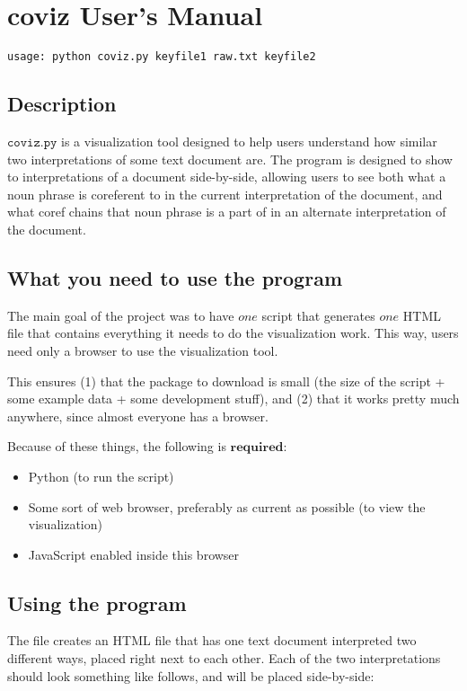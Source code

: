 \documentclass[a4paper]{article}
\begin{document}
\section*{coviz User's Manual}
\begin{verbatim}
usage: python coviz.py keyfile1 raw.txt keyfile2
\end{verbatim}

\subsection*{Description}
$\texttt{coviz.py}$ is a visualization tool designed to help users understand how similar two interpretations of some text document are. The program is designed to show to interpretations of a document side-by-side, allowing users to see both what a noun phrase is coreferent to in the current interpretation of the document, and what coref chains that noun phrase is a part of in an alternate interpretation of the document.

\subsection*{What you need to use the program}

The main goal of the project was to have $\textit{one}$ script that generates $\textit{one}$ HTML file that contains everything it needs to do the visualization work. This way, users need only a browser to use the visualization tool.

This ensures (1) that the package to download is small (the size of the script + some example data + some development stuff), and (2) that it works pretty much anywhere, since almost everyone has a browser.

Because of these things, the following is $\textbf{required}$:

\begin{itemize}
\item Python (to run the script)
\item Some sort of web browser, preferably as current as possible (to view the visualization)
\item JavaScript enabled inside this browser
\end{itemize}

\subsection*{Using the program}

The file creates an HTML file that has one text document interpreted two different ways, placed right next to each other. Each of the two interpretations should look something like follows, and will be placed side-by-side:
\end{document}
